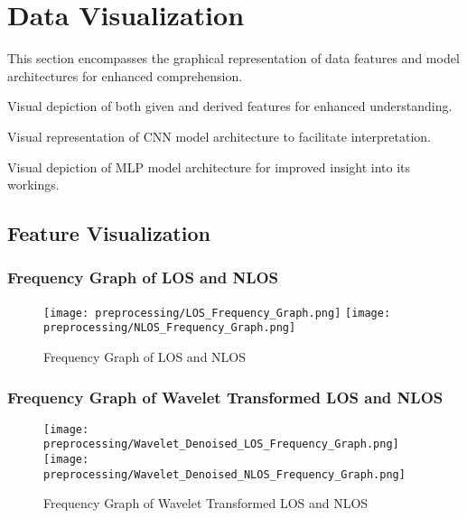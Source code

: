 \section{Data Visualization}\label{data_visualisation}

This section encompasses the graphical representation of data features and model architectures for enhanced comprehension.

\begin{description}[style=nextline]
    \item[Feature Visualization:] Visual depiction of both given and derived features for enhanced understanding.
    \item[Convolution Neural Network:] Visual representation of CNN model architecture to facilitate interpretation.
    \item[Multilayer Perceptron:] Visual depiction of MLP model architecture for improved insight into its workings.
\end{description}

\subsection{Feature Visualization}\label{feature_visualization}

\subsubsection{Frequency Graph of LOS and NLOS}\label{frequency_graph}

\begin{figure}[H] 
	\centering
	\texttt{[image: preprocessing/LOS\_Frequency\_Graph.png]}
	\texttt{[image: preprocessing/NLOS\_Frequency\_Graph.png]}
	\caption{Frequency Graph of LOS and NLOS}\label{fig:frequency_graph}
\end{figure}

\subsubsection{Frequency Graph of Wavelet Transformed LOS and NLOS}\label{frequency_graph_wavelet}

\begin{figure}[H] 
  \centering
  \texttt{[image: preprocessing/Wavelet\_Denoised\_LOS\_Frequency\_Graph.png]}
  \texttt{[image: preprocessing/Wavelet\_Denoised\_NLOS\_Frequency\_Graph.png]}
  \caption{Frequency Graph of Wavelet Transformed LOS and NLOS}\label{fig:frequency_graph_wavelet}
\end{figure}

